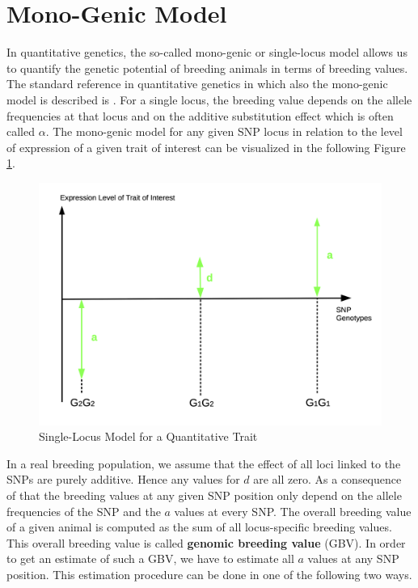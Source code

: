 \documentclass[]{book}
\theoremstyle{definition}
\theoremstyle{definition}
\theoremstyle{definition}
\theoremstyle{remark}
\begin{document}
\hypertarget{asm-mono-genic-model}{%
\section{Mono-Genic Model}\label{asm-mono-genic-model}}

In quantitative genetics, the so-called mono-genic or single-locus model allows us to quantify the genetic potential of breeding animals in terms of breeding values. The standard reference in quantitative genetics in which also the mono-genic model is described is \citep{Falconer1996}. For a single locus, the breeding value depends on the allele frequencies at that locus and on the additive substitution effect which is often called \(\alpha\). The mono-genic model for any given SNP locus in relation to the level of expression of a given trait of interest can be visualized in the following Figure \ref{fig:monogenicsnpmodel}.

\begin{figure}
\centering
\includegraphics{odg/monogenicsnpmodel.png}
\caption{\label{fig:monogenicsnpmodel}Single-Locus Model for a Quantitative Trait}
\end{figure}

In a real breeding population, we assume that the effect of all loci linked to the SNPs are purely additive. Hence any values for \(d\) are all zero. As a consequence of that the breeding values at any given SNP position only depend on the allele frequencies of the SNP and the \(a\) values at every SNP. The overall breeding value of a given animal is computed as the sum of all locus-specific breeding values. This overall breeding value is called \textbf{genomic breeding value} (GBV). In order to get an estimate of such a GBV, we have to estimate all \(a\) values at any SNP position. This estimation procedure can be done in one of the following two ways.
\end{document}
